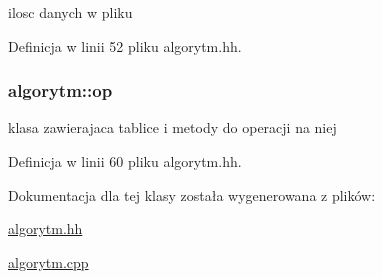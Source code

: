 ilosc danych w pliku 



\-Definicja w linii 52 pliku algorytm.\-hh.

\hypertarget{classalgorytm_aedaee1aa41206b5f050fe660d0846f2d}{
\subsubsection[{op}]{ {\bf algorytm\-::op}}}\label{classalgorytm_aedaee1aa41206b5f050fe660d0846f2d}


klasa zawierajaca tablice i metody do operacji na niej 



\-Definicja w linii 60 pliku algorytm.\-hh.



\-Dokumentacja dla tej klasy została wygenerowana z plików\-:\begin{DoxyCompactItemize}
\item 
\hyperlink{algorytm_8hh}{algorytm.\-hh}\item 
\hyperlink{algorytm_8cpp}{algorytm.\-cpp}\end{DoxyCompactItemize}
